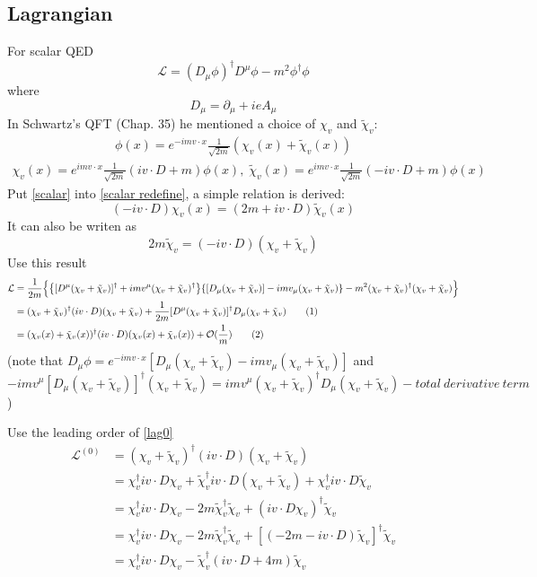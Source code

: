 \documentclass{article}
\newcommand{\lag}{\mathcal{L}}
\begin{document}
 \subsection{Lagrangian}
For scalar QED
$$\mathcal{L}=(D_{\mu}\phi)^{\dagger}D^{\mu}\phi-m^2\phi^{\dagger}\phi$$
where
$$D_{\mu}=\partial_{\mu}+ieA_{\mu}$$
In Schwartz's QFT (Chap. 35) he mentioned a choice of $\chi_v$ and $\tilde \chi_v$:
\begin{align}
\phi(x)=e^{-imv\cdot x}\frac{1}{\sqrt{2m}}(\chi_v(x)+\tilde\chi_v(x))
\label{scalar}
\end{align}
\begin{align}
\chi_v(x)=e^{imv\cdot x}\frac{1}{\sqrt{2m}}(iv\cdot D+m)\phi(x),\;
\tilde\chi_v(x)=e^{imv\cdot x}\frac{1}{\sqrt{2m}}(-iv\cdot D+m)\phi(x)
\label{scalar redefine}
\end{align}
Put \eqref{scalar} into \eqref{scalar redefine}, a simple relation is derived:
$$(-iv\cdot D)\chi_v(x)=(2m+iv\cdot D)\tilde\chi_v(x)$$
It can also be writen as 
$$2m\tilde\chi_v=(-iv\cdot D)(\chi_v+\tilde\chi_v) $$
Use this result 
\begin{align*}
  \mathcal{L}&=\frac{1}{2m}\Big\{\Bqty{[D^{\mu}(\chi_v+\tilde\chi_v)]^{\dagger}+imv^{\mu}(\chi_v+\tilde\chi_v)^{\dagger}}\Bqty{[D_{\mu}(\chi_v+\tilde\chi_v)]-imv_{\mu}(\chi_v+\tilde\chi_v)}-m^2(\chi_v+\tilde\chi_v)^{\dagger}(\chi_v+\tilde\chi_v)\Big\}\\
  &=(\chi_v+\tilde\chi_v)^{\dagger}(iv\cdot D)(\chi_v+\tilde\chi_v)+\frac{1}{2m}[D^{\mu}(\chi_v+\tilde\chi_v)]^{\dagger}D_{\mu}(\chi_v+\tilde\chi_v)
  \stepcounter{equation}\tag{\theequation}\label{lag0}\\
&=(\chi_v(x)+\tilde\chi_v(x))^{\dagger}(iv\cdot D)(\chi_v(x)+\tilde\chi_v(x))+\mathcal{O}(\frac{1}{m}) \stepcounter{equation}\tag{\theequation}\label{lag1}
\end{align*}
(note that $D_{\mu}\phi=e^{-imv\cdot x}[D_{\mu}(\chi_v+\tilde \chi_v)-imv_{\mu}(\chi_v+\tilde\chi_v)]$ and $-imv^{\mu}[D_{\mu}(\chi_v+\tilde \chi_v)]^{\dagger}(\chi_v+\tilde \chi_v)=imv^{\mu}(\chi_v+\tilde\chi_v)^{\dagger}D_{\mu}(\chi_v+\tilde \chi_v)-total\ derivative\ term$)

Use the leading order of \eqref{lag0} 
\begin{align*}
  \lag^{(0)}&=(\chi_v+\tilde\chi_v)^{\dagger}(iv\cdot D)(\chi_v+\tilde\chi_v)\\
  &=\chi_v^{\dagger}iv\cdot D\chi_v+\tilde\chi_v^{\dagger}iv\cdot D(\chi_v+\tilde\chi_v)+\chi_v^{\dagger}iv\cdot D\tilde\chi_v\\
  &=\chi_v^{\dagger}iv\cdot D\chi_v-2m\tilde\chi_v^{\dagger}\tilde\chi_v+(iv\cdot D\chi_v)^{\dagger}\tilde\chi_v\\
&=\chi_v^{\dagger}iv\cdot D\chi_v-2m\tilde\chi_v^{\dagger}\tilde\chi_v+[(-2m-iv\cdot D)\tilde\chi_v]^{\dagger}\tilde\chi_v\\
&=\chi_v^{\dagger}iv\cdot D\chi_v-\tilde\chi_v^{\dagger}(iv\cdot D+4m)\tilde\chi_v
\end{align*}
\end{document}
